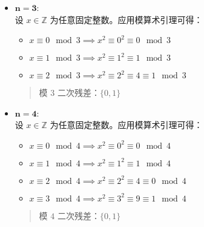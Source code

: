 \begin{example}
\begin{itemize}
        \item $\mathbf{n=3}$:\\
        设 $x \in \mathbb{Z}$ 为任意固定整数。应用模算术引理可得：
        \begin{itemize}
            \item $x \equiv 0 \mod 3 \implies x^2 \equiv 0^2 \equiv 0 \mod 3$
            \item $x \equiv 1 \mod 3 \implies x^2 \equiv 1^2 \equiv 1 \mod 3$
            \item $x \equiv 2 \mod 3 \implies x^2 \equiv 2^2 \equiv 4 \equiv 1 \mod 3$
        \end{itemize}
        \begin{quotation}
            \begin{center}
                \large 模 $3$ 二次残差：$\{0, 1\}$
            \end{center}
        \end{quotation}

        \item $\mathbf{n=4}$:\\
        设 $x \in \mathbb{Z}$ 为任意固定整数。应用模算术引理可得：
        \begin{itemize}
            \item $x \equiv 0 \mod 4 \implies x^2 \equiv 0^2 \equiv 0 \mod 4$
            \item $x \equiv 1 \mod 4 \implies x^2 \equiv 1^2 \equiv 1 \mod 4$
            \item $x \equiv 2 \mod 4 \implies x^2 \equiv 2^2 \equiv 4 \equiv 0 \mod 4$
            \item $x \equiv 3 \mod 4 \implies x^2 \equiv 3^2 \equiv 9 \equiv 1 \mod 4$
        \end{itemize}
        \begin{quotation}
            \begin{center}
                \large 模 $4$ 二次残差：$\{0, 1\}$
            \end{center}
        \end{quotation}


\end{itemize}
\end{example}

